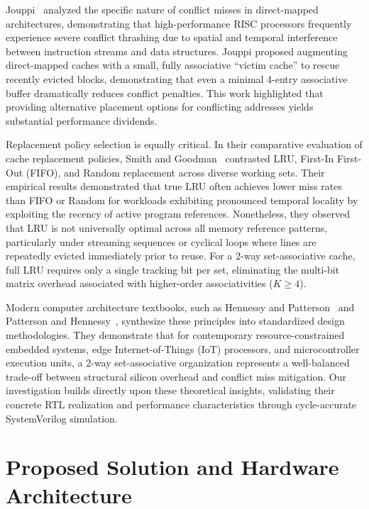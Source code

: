 \documentclass[conference]{IEEEtran}
\begin{document}
Jouppi~\cite{jouppi1990improving} analyzed the specific nature of conflict misses in direct-mapped architectures, demonstrating that high-performance RISC processors frequently experience severe conflict thrashing due to spatial and temporal interference between instruction streams and data structures. Jouppi proposed augmenting direct-mapped caches with a small, fully associative ``victim cache'' to rescue recently evicted blocks, demonstrating that even a minimal 4-entry associative buffer dramatically reduces conflict penalties. This work highlighted that providing alternative placement options for conflicting addresses yields substantial performance dividends.

Replacement policy selection is equally critical. In their comparative evaluation of cache replacement policies, Smith and Goodman~\cite{smith1983instruction} contrasted LRU, First-In First-Out (FIFO), and Random replacement across diverse working sets. Their empirical results demonstrated that true LRU often achieves lower miss rates than FIFO or Random for workloads exhibiting pronounced temporal locality by exploiting the recency of active program references. Nonetheless, they observed that LRU is not universally optimal across all memory reference patterns, particularly under streaming sequences or cyclical loops where lines are repeatedly evicted immediately prior to reuse. For a 2-way set-associative cache, full LRU requires only a single tracking bit per set, eliminating the multi-bit matrix overhead associated with higher-order associativities ($K \ge 4$).

Modern computer architecture textbooks, such as Hennessy and Patterson~\cite{hennessy2017computer} and Patterson and Hennessy~\cite{patterson2020riscv}, synthesize these principles into standardized design methodologies. They demonstrate that for contemporary resource-constrained embedded systems, edge Internet-of-Things (IoT) processors, and microcontroller execution units, a 2-way set-associative organization represents a well-balanced trade-off between structural silicon overhead and conflict miss mitigation. Our investigation builds directly upon these theoretical insights, validating their concrete RTL realization and performance characteristics through cycle-accurate SystemVerilog simulation.

\section{Proposed Solution and Hardware Architecture}
\label{sec:architecture}
\end{document}

